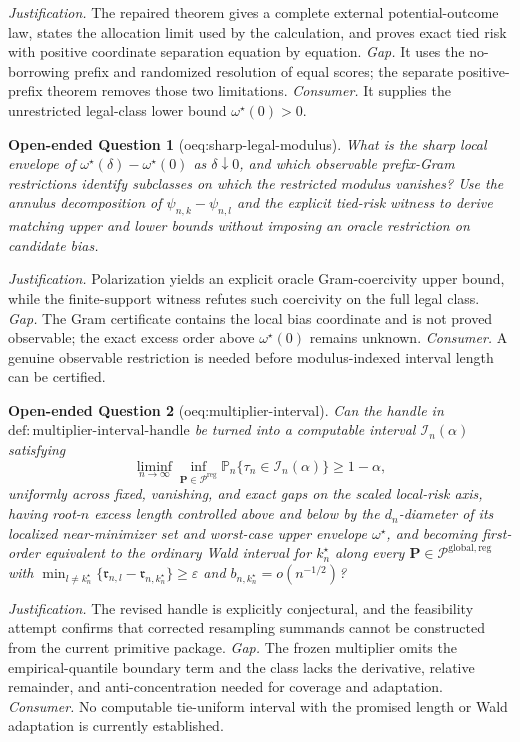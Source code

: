 \documentclass{article}
\newtheorem{openendedquestion}{Open-ended Question}
\begin{document}
\par\smallskip\noindent \textit{Justification.} The repaired theorem gives a complete external potential-outcome law, states the allocation limit used by the calculation, and proves exact tied risk with positive coordinate separation equation by equation. \textit{Gap.} It uses the no-borrowing prefix and randomized resolution of equal scores; the separate positive-prefix theorem removes those two limitations. \textit{Consumer.} It supplies the unrestricted legal-class lower bound \(\omega^{\star}(0)>0\).

\begin{openendedquestion}[oeq:sharp-legal-modulus]\label{oeq:sharp-legal-modulus}
What is the sharp local envelope of \(\omega^{\star}(\delta)-\omega^{\star}(0)\) as \(\delta\downarrow0\), and which observable prefix-Gram restrictions identify subclasses on which the restricted modulus vanishes? Use the annulus decomposition of \(\psi_{n,k}-\psi_{n,l}\) and the explicit tied-risk witness to derive matching upper and lower bounds without imposing an oracle restriction on candidate bias.
\end{openendedquestion}
\par\smallskip\noindent \textit{Justification.} Polarization yields an explicit oracle Gram-coercivity upper bound, while the finite-support witness refutes such coercivity on the full legal class. \textit{Gap.} The Gram certificate contains the local bias coordinate and is not proved observable; the exact excess order above \(\omega^{\star}(0)\) remains unknown. \textit{Consumer.} A genuine observable restriction is needed before modulus-indexed interval length can be certified.

\begin{openendedquestion}[oeq:multiplier-interval]\label{oeq:multiplier-interval}
Can the handle in \(\mathrm{def:multiplier\text{-}interval\text{-}handle}\) be turned into a computable interval \(\mathcal I_n(\alpha)\) satisfying \[\liminf_{n\to\infty}\inf_{\mathbf P\in\mathcal P^{\mathrm{reg}}}\mathbb P_n\{\tau_n\in\mathcal I_n(\alpha)\}\ge1-\alpha,\] uniformly across fixed, vanishing, and exact gaps on the scaled local-risk axis, having root-\(n\) excess length controlled above and below by the \(d_n\)-diameter of its localized near-minimizer set and worst-case upper envelope \(\omega^{\star}\), and becoming first-order equivalent to the ordinary Wald interval for \(k_n^{\star}\) along every \(\mathbf P\in\mathcal P^{\mathrm{global,reg}}\) with \(\min_{l\ne k_n^{\star}}\{\mathfrak r_{n,l}-\mathfrak r_{n,k_n^{\star}}\}\ge\varepsilon\) and \(b_{n,k_n^{\star}}=o(n^{-1/2})\)?
\end{openendedquestion}
\par\smallskip\noindent \textit{Justification.} The revised handle is explicitly conjectural, and the feasibility attempt confirms that corrected resampling summands cannot be constructed from the current primitive package. \textit{Gap.} The frozen multiplier omits the empirical-quantile boundary term and the class lacks the derivative, relative remainder, and anti-concentration needed for coverage and adaptation. \textit{Consumer.} No computable tie-uniform interval with the promised length or Wald adaptation is currently established.
\end{document}
